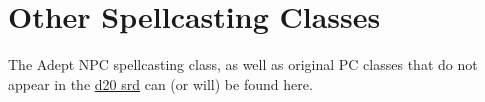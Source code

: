 \section{Other Spellcasting Classes}
The Adept NPC spellcasting class, as well as original PC classes that do not appear in the \href{http://www.wizards.com/default.asp?x=d20/article/srd35}{d20 srd} can (or will) be found here.
%